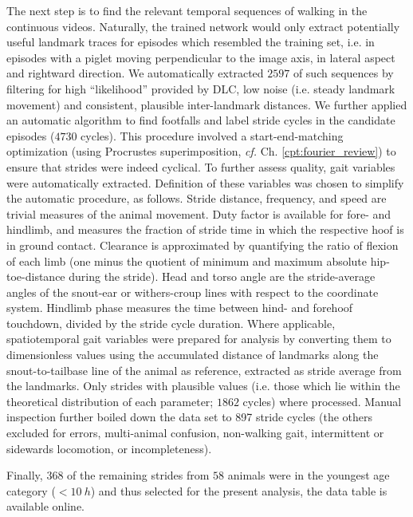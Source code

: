 The next step is to find the relevant temporal sequences of walking in the continuous videos.
Naturally, the trained network would only extract potentially useful landmark traces for episodes which resembled the training set, i.e. in episodes with a piglet moving perpendicular to the image axis, in lateral aspect and rightward direction.
We automatically extracted \(2597\) of such sequences by filtering for high  ``likelihood'' provided by DLC, low noise (i.e. steady landmark movement) and consistent, plausible inter-landmark distances.
We further applied an automatic algorithm to find footfalls and label stride cycles in the candidate episodes (\(4730\) cycles).
This procedure involved a start-end-matching optimization (using Procrustes superimposition, \textit{cf.} Ch. \ref{cpt:fourier_review}) to ensure that strides were indeed cyclical.
To further assess  quality, gait variables were automatically extracted.
Definition of these variables was chosen to simplify the automatic procedure, as follows.
Stride distance, frequency, and speed are trivial measures of the animal movement.
Duty factor is available for fore- and hindlimb, and measures the fraction of stride time in which the respective hoof is in ground contact.
Clearance is approximated by quantifying the ratio of flexion of each limb (one minus the quotient of minimum and maximum absolute hip-toe-distance during the stride).
Head and torso angle are the stride-average angles of the snout-ear or withers-croup lines with respect to the coordinate system.
Hindlimb phase measures the time between hind- and forehoof touchdown, divided by the stride cycle duration.
Where applicable, spatiotemporal gait variables were prepared for analysis by converting them to dimensionless values \citep{Hof1996,Alexander1983} using the accumulated distance of landmarks along the snout-to-tailbase line of the animal as reference, extracted as stride average from the  landmarks.
Only strides with plausible values (i.e. those which lie within the theoretical distribution of each parameter; \(1862\) cycles) where processed.
Manual inspection further boiled down the data set to 897 stride cycles (the others excluded for  errors, multi-animal confusion, non-walking gait, intermittent or sidewards locomotion, or incompleteness).

Finally, \(368\) of the remaining strides from \(58\) animals were in the youngest age category (\(<10\ h\)) and thus selected for the present analysis, the data table is available online.


